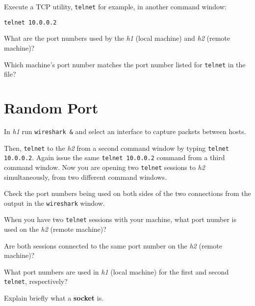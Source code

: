 \documentclass{../UTNetLab}
\begin{document}
    Execute a TCP utility, \lstinline{telnet} for example, in another command window:
    \begin{lstlisting}
telnet 10.0.0.2
    \end{lstlisting}
    
    \begin{report}
    \item What are the port numbers used by the \textit{h1} (local machine) and \textit{h2} (remote machine)?

    \item Which machine’s port number matches the port number listed for \lstinline{telnet} in the  file?
    \end{report}

\section{Random Port}
    In \textit{h1} run \lstinline{wireshark &} and select an interface to capture packets between hosts.

    Then, \lstinline{telnet} to the \textit{h2} from a second command window by typing \lstinline{telnet 10.0.0.2}.
    Again issue the same \lstinline{telnet 10.0.0.2} command from a third command window.
    Now you are opening two \lstinline{telnet} sessions to \textit{h2} simultaneously, from two different command windows.

    Check the port numbers being used on both sides of the two connections from the output in the \lstinline{wireshark} window.

    \begin{report}
    \item When you have two \lstinline{telnet} sessions with your machine, what port number is used on the \textit{h2} (remote machine)?

    \item Are both sessions connected to the same port number on the \textit{h2} (remote machine)?

    \item What port numbers are used in \textit{h1} (local machine) for the first and second \lstinline{telnet}, respectively?

    \item Explain briefly what a \textbf{socket} is.
    \end{report}
\end{document}
